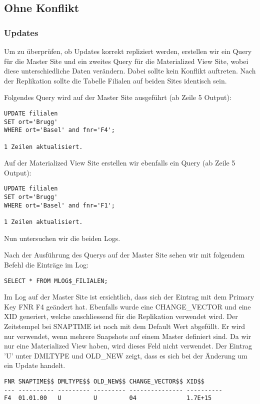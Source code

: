\documentclass[11pt,a4paper,parskip=half]{scrartcl}
\begin{document}
\subsection{Ohne Konflikt}
\subsubsection{Updates}
Um zu überprüfen, ob Updates korrekt repliziert werden, erstellen wir ein Query für die Master Site und ein zweites Query für die Materialized View Site, wobei diese unterschiedliche Daten verändern. Dabei sollte kein Konflikt auftreten. Nach der Replikation sollte die Tabelle Filialen auf beiden Sites identisch sein.

Folgendes Query wird auf der Master Site ausgeführt (ab Zeile 5 Output):
\begin{lstlisting}
UPDATE filialen
SET ort='Brugg'
WHERE ort='Basel' and fnr='F4'; 

1 Zeilen aktualisiert.
\end{lstlisting}

Auf der Materialized View Site erstellen wir ebenfalls ein Query (ab Zeile 5 Output):
\begin{lstlisting}
UPDATE filialen
SET ort='Brugg'
WHERE ort='Basel' and fnr='F1'; 

1 Zeilen aktualisiert.
\end{lstlisting}

Nun untersuchen wir die beiden Logs.

Nach der Ausführung des Querys auf der Master Site sehen wir mit folgendem Befehl die Einträge im Log:
\begin{lstlisting}
SELECT * FROM MLOG$_FILIALEN;
\end{lstlisting}

Im Log auf der Master Site ist ersichtlich, dass sich der Eintrag mit dem Primary Key FNR F4 geändert hat. Ebenfalls wurde eine CHANGE\_VECTOR und eine XID generiert, welche anschliessend für die Replikation verwendet wird.  Der Zeitstempel bei SNAPTIME ist noch mit dem Default Wert abgefüllt. Er wird nur verwendet, wenn mehrere Snapshots auf einem Master definiert sind. Da wir nur eine Materialized View haben, wird dieses Feld nicht verwendet. Der Eintrag 'U' unter DMLTYPE und  OLD\_NEW zeigt, dass es sich bei der Änderung um ein Update handelt.
\begin{lstlisting}
FNR SNAPTIME$$ DMLTYPE$$ OLD_NEW$$ CHANGE_VECTOR$$ XID$$
--- ---------- --------- --------- --------------- ----------
F4  01.01.00   U         U         04              1.7E+15 
\end{lstlisting}
\end{document}
